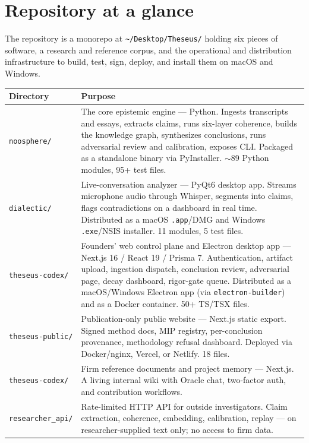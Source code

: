 \documentclass[11pt,letterpaper]{article}
\newcommand{\file}[1]{\texttt{#1}}
\begin{document}
\section{Repository at a glance}

The repository is a monorepo at \file{\textasciitilde/Desktop/Theseus/} holding six pieces of software, a research and reference corpus, and the operational and distribution infrastructure to build, test, sign, deploy, and install them on macOS and Windows.

\begin{longtable}{p{3.2cm} p{11.3cm}}
\toprule
\textbf{Directory} & \textbf{Purpose} \\
\midrule
\endhead
\file{noosphere/}            & The core epistemic engine --- Python. Ingests transcripts and essays, extracts claims, runs six-layer coherence, builds the knowledge graph, synthesizes conclusions, runs adversarial review and calibration, exposes CLI. Packaged as a standalone binary via PyInstaller. ${\sim}$89 Python modules, 95{+} test files. \\
\file{dialectic/}            & Live-conversation analyzer --- PyQt6 desktop app. Streams microphone audio through Whisper, segments into claims, flags contradictions on a dashboard in real time. Distributed as a macOS \texttt{.app}/DMG and Windows \texttt{.exe}/NSIS installer. 11 modules, 5 test files. \\
\file{theseus-codex/}       & Founders' web control plane and Electron desktop app --- Next.js 16 / React 19 / Prisma 7. Authentication, artifact upload, ingestion dispatch, conclusion review, adversarial page, decay dashboard, rigor-gate queue. Distributed as a macOS/Windows Electron app (via \texttt{electron-builder}) and as a Docker container. 50{+} TS/TSX files. \\
\file{theseus-public/}       & Publication-only public website --- Next.js static export. Signed method docs, MIP registry, per-conclusion provenance, methodology refusal dashboard. Deployed via Docker/nginx, Vercel, or Netlify. 18 files. \\
\file{theseus-codex/}        & Firm reference documents and project memory --- Next.js. A living internal wiki with Oracle chat, two-factor auth, and contribution workflows. \\
\file{researcher\_api/}      & Rate-limited HTTP API for outside investigators. Claim extraction, coherence, embedding, calibration, replay --- on researcher-supplied text only; no access to firm data. \\

\end{longtable}
\end{document}
